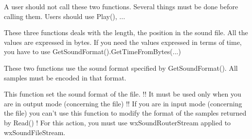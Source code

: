 \label{wxsoundfilestreamstartproduction}

A user should not call these two functions.
Several things must be done before calling them.
Users should use Play(), ... 


\label{wxsoundfilestreamstopproduction}



\label{wxsoundfilestreamgetlength}


These three functions deals with the length, the position in the sound file.
All the values are expressed in bytes. If you need the values expressed
in terms of time, you have to use GetSoundFormat().GetTimeFromBytes(...)

\label{wxsoundfilestreamgetposition}



\label{wxsoundfilestreamsetposition}



\label{wxsoundfilestreamread}


These two functions use the sound format specified by GetSoundFormat().
All samples must be encoded in that format. 


\label{wxsoundfilestreamwrite}



\label{wxsoundfilestreamsetsoundformat}


This function set the sound format of the file. !! It must be used only
when you are in output mode (concerning the file) !! If you are in
input mode (concerning the file) you can't use this function to modify
the format of the samples returned by Read() !
For this action, you must use wxSoundRouterStream applied to wxSoundFileStream. 


